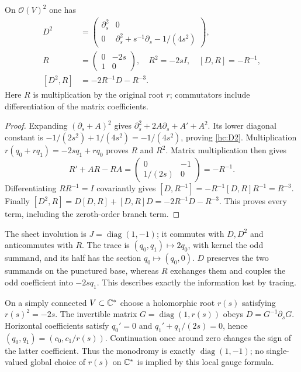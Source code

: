 \begin{proposition}
On $\mathcal O(V)^2$ one has
\begin{align}
D^2&=\begin{pmatrix}
\partial_s^2&0\\0&\partial_s^2+s^{-1}\partial_s-1/(4s^2)
\end{pmatrix}, \label{hc:D2}\\
R&=\begin{pmatrix}0&-2s\\1&0\end{pmatrix},\quad
R^2=-2sI,\quad [D,R]=-R^{-1}, \label{hc:R}\\
[D^2,R]&=-2R^{-1}D-R^{-3}. \label{hc:D2R}
\end{align}
Here $R$ is multiplication by the original root $r$; commutators
include differentiation of the matrix coefficients.
\end{proposition}
\begin{proof}
Expanding $(\partial_s+A)^2$ gives
$\partial_s^2+2A\partial_s+A'+A^2$.
Its lower diagonal constant is
$-1/(2s^2)+1/(4s^2)=-1/(4s^2)$, proving \eqref{hc:D2}.
Multiplication $r(q_0+rq_1)=-2sq_1+rq_0$ proves $R$ and $R^2$.
Matrix multiplication then gives
\[
R'+AR-RA=\begin{pmatrix}0&-1\\1/(2s)&0\end{pmatrix}=-R^{-1}.
\]
Differentiating $RR^{-1}=I$ covariantly gives
$[D,R^{-1}]=-R^{-1}[D,R]R^{-1}=R^{-3}$.
Finally $[D^2,R]=D[D,R]+[D,R]D=-2R^{-1}D-R^{-3}$.
This proves every term, including the zeroth-order branch term.
\end{proof}

The sheet involution is $J=\operatorname{diag}(1,-1)$; it commutes
with $D,D^2$ and anticommutes with $R$.
The trace is $(q_0,q_1)\mapsto2q_0$, with kernel the odd summand,
and its half has the section $q_0\mapsto(q_0,0)$.
$D$ preserves the two summands on the punctured base, whereas $R$
exchanges them and couples the odd coefficient into $-2sq_1$.
This describes exactly the information lost by tracing.

On a simply connected $V\subset\mathbb C^*$ choose a holomorphic root
$r(s)$ satisfying $r(s)^2=-2s$. The invertible matrix
$G=\operatorname{diag}(1,r(s))$ obeys
$D=G^{-1}\partial_sG$.
Horizontal coefficients satisfy $q_0'=0$ and
$q_1'+q_1/(2s)=0$, hence $(q_0,q_1)=(c_0,c_1/r(s))$.
Continuation once around zero changes the sign of the latter
coefficient. Thus the monodromy is exactly
$\operatorname{diag}(1,-1)$; no single-valued global choice of
$r(s)$ on $\mathbb C^*$ is implied by this local gauge formula.

